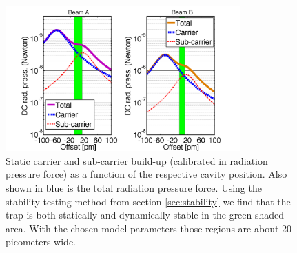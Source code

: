 \begin{figure}[htbp]
	\centering
		\includegraphics[width=9cm]{./figures/DC_offset_paper3.pdf}
	\caption[Stability Range]{{
        Static carrier and sub-carrier build-up (calibrated in radiation pressure force) as a function of the respective cavity position. Also shown in blue is the total radiation pressure force. Using the stability testing method from section \ref{sec:stability} we find that the trap is both statically and dynamically stable in the green shaded area.
With the chosen model parameters those regions are about 
20 picometers wide.}}
	\label{fig:stability_region}
\end{figure}



